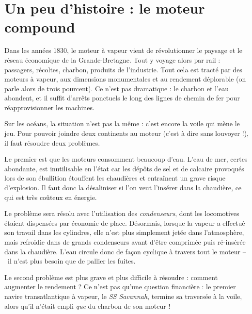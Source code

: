 \atstartofhistorysection
\section[Un peu d’histoire : le moteur compound]{Un peu d’histoire :\onlyamphibook{\\} le moteur compound}

	Dans les années 1830, le moteur à vapeur vient de révolutionner le paysage et le réseau économique de la Grande-Bretagne. Tout y voyage alors par rail : passagers, récoltes, charbon, produits de l’industrie. Tout cela est tracté par des moteurs à vapeur, aux dimensions monumentales et au rendement déplorable (on parle alors de trois pourcent). Ce n’est pas dramatique : le charbon et l’eau abondent, et il suffit d’arrêts ponctuels le long des lignes de chemin de fer pour réapprovisionner les machines.

	Sur les océans, la situation n’est pas la même : c’est encore la voile qui mène le jeu. Pour pouvoir joindre deux continents au moteur (c’est à dire sans louvoyer !), il faut résoudre deux problèmes.

	Le premier est que les moteurs consomment beaucoup d’eau. L’eau de mer, certes abondante, est inutilisable en l’état car les dépôts de sel et de calcaire provoqués lors de son ébullition étouffent les chaudières et entraînent un grave risque d’explosion. Il faut donc la désaliniser si l’on veut l’insérer dans la chaudière, ce qui est très coûteux en énergie.

	Le problème sera résolu avec l’utilisation des \textit{condenseurs}, dont les locomotives étaient dispensées par économie de place. Désormais, lorsque la vapeur a effectué son travail dans les cylindres, elle n’est plus simplement jetée dans l’atmosphère, mais refroidie dans de grands condenseurs avant d’être comprimée puis ré-insérée dans la chaudière. L’eau circule donc de façon cyclique à travers tout le moteur --\ il n’est plus besoin que de pallier les fuites.

	Le second problème est plus grave et plus difficile à résoudre : comment augmenter le rendement ? Ce n’est pas qu’une question financière : le premier navire transatlantique à vapeur, le \textit{SS Savannah}, termine sa traversée à la voile, alors qu’il n’était empli \emph{que} du charbon de son moteur !

